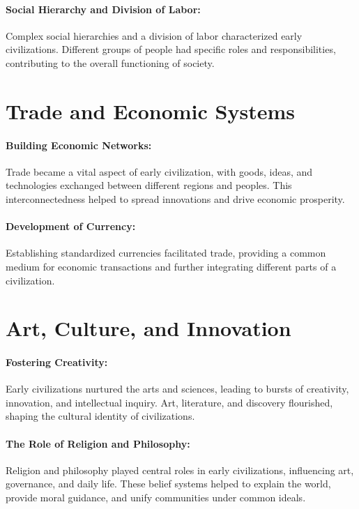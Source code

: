 \documentclass{book}
\begin{document}
\paragraph{Social Hierarchy and Division of Labor:}
Complex social hierarchies and a division of labor characterized early civilizations. Different groups of people had specific roles and responsibilities, contributing to the overall functioning of society.

\section*{Trade and Economic Systems}

\paragraph{Building Economic Networks:}
Trade became a vital aspect of early civilization, with goods, ideas, and technologies exchanged between different regions and peoples. This interconnectedness helped to spread innovations and drive economic prosperity.

\paragraph{Development of Currency:}
Establishing standardized currencies facilitated trade, providing a common medium for economic transactions and further integrating different parts of a civilization.

\section*{Art, Culture, and Innovation}

\paragraph{Fostering Creativity:}
Early civilizations nurtured the arts and sciences, leading to bursts of creativity, innovation, and intellectual inquiry. Art, literature, and discovery flourished, shaping the cultural identity of civilizations.

\paragraph{The Role of Religion and Philosophy:}
Religion and philosophy played central roles in early civilizations, influencing art, governance, and daily life. These belief systems helped to explain the world, provide moral guidance, and unify communities under common ideals.
\end{document}
